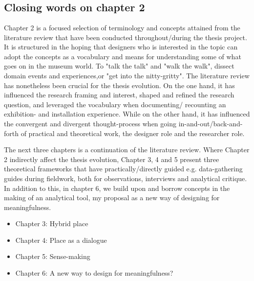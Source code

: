 
\chapter*{  }

\section*{Closing words on chapter 2}
Chapter 2 is a focused selection of terminology and concepts attained from the literature review that have been conducted throughout/during the thesis project. It is structured in the hoping that designers who is interested in the topic can adopt the concepts as a vocabulary and means for understanding some of what goes on in the museum world. To "talk the talk" and "walk the walk", dissect domain events and experiences,or  "get into the nitty-gritty". The literature review has nonetheless been crucial for the thesis evolution. On the one hand, it has influenced the research framing and interest, shaped and refined the research question, and leveraged the vocabulary when documenting/ recounting an exhibition- and installation experience. While on the other hand, it has influenced the convergent and divergent thought-process when going in-and-out/back-and-forth of practical and theoretical work, the designer role and the researcher role.

The next three chapters is a continuation of the literature review. Where Chapter 2 indirectly affect the thesis evolution, Chapter 3, 4 and 5 present three theoretical frameworks that have practically/directly guided e.g. data-gathering guides during fieldwork, both for observations, interviews and analytical critique. In addition to this, in chapter 6, we build upon and borrow concepts in the making of an analytical tool, my proposal as a new way of designing for meaningfulness.

\begin{itemize}
    \item Chapter 3: Hybrid place
    \item Chapter 4: Place as a dialogue
    \item Chapter 5: Sense-making
    \item Chapter 6: A new way to design for meaningfulness?
\end{itemize}
\par


